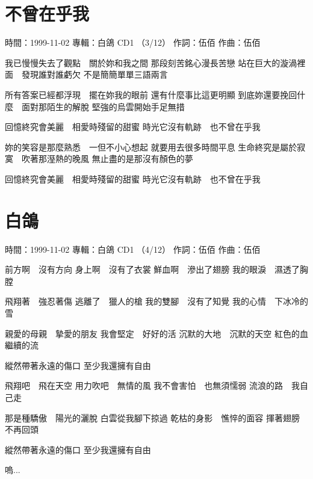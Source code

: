 \documentclass[UTF8,a4paper,oneside,twocolumn,12pt]{ctexbook}
\newcommand{\infopair}[2]{\textbullet #1：#2}
\newcommand{\zc}[1][伍佰]{\infopair{作詞}{#1}}
\newcommand{\zq}[1][伍佰]{\infopair{作曲}{#1}}
\newcommand{\zj}[1]{\infopair{專輯}{#1}}
\newcommand{\sj}[1]{\infopair{時間}{#1}}
\newenvironment{info}{\begin{flushleft}\kaishu
	}
	{\end{flushleft}\normalsize\yahei\par}
\newenvironment{lyric}{
	}
{}
\begin{document}
\section{不曾在乎我}
\begin{info}
	\sj{1999-11-02}
	\zj{白鴿 CD1 （3/12）}
	\zc
	\zq
\end{info}
\begin{lyric}
	我已慢慢失去了觀點　關於妳和我之間
	那段刻苦銘心漫長苦戀
	站在巨大的漩渦裡面　發現誰對誰虧欠
	不是簡簡單單三語兩言

	所有答案已經都浮現　擺在妳我的眼前
	還有什麼事比這更明顯
	到底妳還要挽回什麼　面對那陌生的解脫
	堅強的烏雲開始手足無措

	回憶終究會美麗　相愛時殘留的甜蜜
	時光它沒有軌跡　也不曾在乎我

	妳的笑容是那麼熟悉　一但不小心想起
	就要用去很多時間平息
	生命終究是屬於寂寞　吹著那溼熱的晚風
	無止盡的是那沒有顏色的夢

	回憶終究會美麗　相愛時殘留的甜蜜
	時光它沒有軌跡　也不曾在乎我
\end{lyric}

\section{白鴿}
\begin{info}
	\sj{1999-11-02}
	\zj{白鴿 CD1 （4/12）}
	\zc
	\zq
\end{info}
\begin{lyric}
	前方啊　沒有方向
	身上啊　沒有了衣裳
	鮮血啊　滲出了翅膀
	我的眼淚　濕透了胸膛

	飛翔著　強忍著傷
	逃離了　獵人的槍
	我的雙腳　沒有了知覺
	我的心情　下冰冷的雪

	親愛的母親　摯愛的朋友
	我會堅定　好好的活
	沉默的大地　沉默的天空
	紅色的血　繼續的流

	縱然帶著永遠的傷口
	至少我還擁有自由

	飛翔吧　飛在天空
	用力吹吧　無情的風
	我不會害怕　也無須懦弱
	流浪的路　我自己走

	那是種驕傲　陽光的灑脫
	白雲從我腳下掠過
	乾枯的身影　憔悴的面容
	揮著翅膀　不再回頭

	縱然帶著永遠的傷口
	至少我還擁有自由

	嗚...
\end{lyric}
\end{document}
